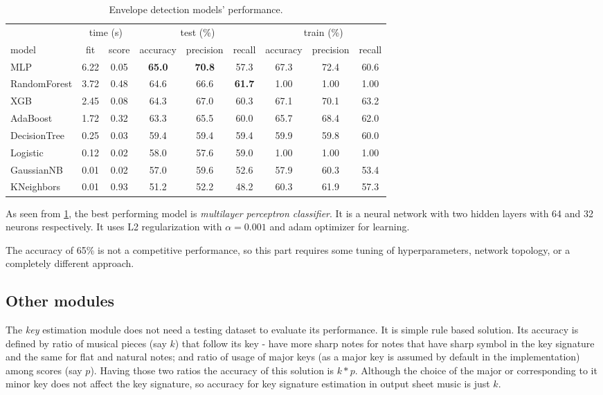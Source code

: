 \begin{table}[H]
	\begin{center}
		\hspace*{-1cm}\begin{tabular}{l|cc|ccc|ccc}
			\hline
								& \multicolumn{2}{c|}{time (s)} & \multicolumn{3}{c|}{test (\%)} & \multicolumn{3}{c}{train (\%)} \\
	        model 				& fit & score & accuracy & precision & recall & accuracy & precision & recall \\ \hline \hline
			MLP		 			& 6.22 & 0.05 & \textbf{65.0} & \textbf{70.8} & 57.3 & 67.3 & 72.4 & 60.6 \\
			RandomForest 		& 3.72 & 0.48 & 64.6 & 66.6 & \textbf{61.7} & 1.00 & 1.00 & 1.00 \\
			XGB 				& 2.45 & 0.08 & 64.3 & 67.0 & 60.3 & 67.1 & 70.1 & 63.2 \\
			AdaBoost 			& 1.72 & 0.32 & 63.3 & 65.5 & 60.0 & 65.7 & 68.4 & 62.0 \\
			DecisionTree 		& 0.25 & 0.03 & 59.4 & 59.4 & 59.4 & 59.9 & 59.8 & 60.0 \\
			Logistic			& 0.12 & 0.02 & 58.0 & 57.6 & 59.0 & 1.00 & 1.00 & 1.00 \\
			GaussianNB 			& 0.01 & 0.02 & 57.0 & 59.6 & 52.6 & 57.9 & 60.3 & 53.4 \\
			KNeighbors 			& 0.01 & 0.93 & 51.2 & 52.2 & 48.2 & 60.3 & 61.9 & 57.3 \\ \hline
		\end{tabular}
		\caption{Envelope detection models' performance.}
		\label{fig:envelope-detection-performance}
	\end{center}
\end{table}

As seen from \cref{fig:envelope-detection-performance}, the best performing model is \textit{multilayer perceptron
classifier}. It is a neural network with two hidden layers with 64 and 32 neurons respectively. It uses L2
regularization with $\alpha=0.001$ and adam optimizer for learning.

The accuracy of 65\% is not a competitive performance, so this part requires some tuning of hyperparameters, network
topology, or a completely different approach.

\subsection{Other modules}\label{subsec:other-modules}
The \textit{key} estimation module does not need a testing dataset to evaluate its performance. It is simple rule
based solution. Its accuracy is defined by ratio of musical pieces (say $k$) that follow its key - have more sharp notes
for notes that have sharp symbol in the key signature and the same for flat and natural notes; and ratio of usage of
major keys (as a major key is assumed by default in the implementation) among scores (say $p$). Having those two ratios
the accuracy of this solution is $k*p$. Although the choice of the major or corresponding to it minor key does not
affect the key signature, so accuracy for key signature estimation in output sheet music is just $k$.

